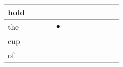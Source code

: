 \documentclass[landscape]{article}
\newcommand{\ssp}{\hspace{2pt}}
\newcommand{\mex}{\cellcolor{g}$\bullet$}
\begin{document}
\begin{tabular}{|l|p{10pt}|p{10pt}|p{10pt}|p{10pt}|p{10pt}|p{10pt}|p{10pt}|p{10pt}|p{10pt}|p{10pt}|p{10pt}|}
\hline
\ssp hold \ssp&\hspace{2pt}&\hspace{2pt}&\hspace{2pt}&\hspace{2pt}&\hspace{2pt}&\hspace{2pt}&\hspace{2pt}&\hspace{2pt}&\hspace{2pt}&\hspace{2pt}&\hspace{2pt}\\
\hline
\ssp \cellcolor{ref3}the \ssp&\hspace{2pt}&\hspace{2pt}&\hspace{2pt}&\hspace{2pt}\mex&\hspace{2pt}&\hspace{2pt}&\hspace{2pt}&\hspace{2pt}&\hspace{2pt}&\hspace{2pt}&\hspace{2pt}\\
\hline
\ssp cup \ssp&\hspace{2pt}&\hspace{2pt}&\hspace{2pt}&\hspace{2pt}&\hspace{2pt}&\hspace{2pt}&\hspace{2pt}&\hspace{2pt}&\hspace{2pt}&\hspace{2pt}&\hspace{2pt}\\
\hline
\ssp of \ssp&\hspace{2pt}&\hspace{2pt}&\hspace{2pt}&\hspace{2pt}&\hspace{2pt}&\hspace{2pt}&\hspace{2pt}&\hspace{2pt}&\hspace{2pt}&\hspace{2pt}&\hspace{2pt}\\

\end{tabular}
\end{document}
